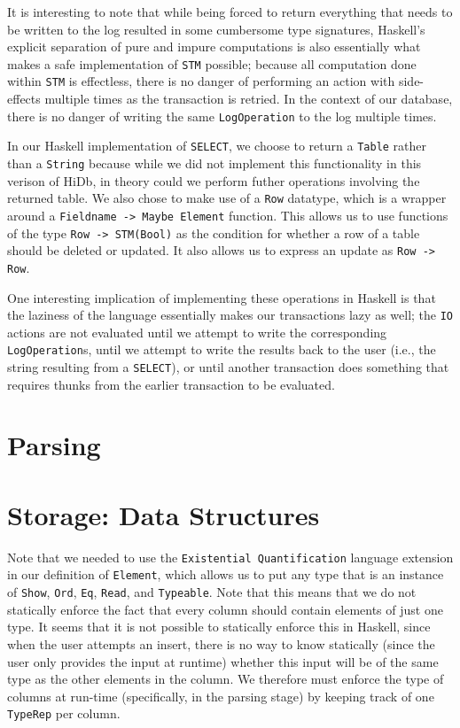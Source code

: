 \documentclass[10pt]{article}
\begin{document}
\begin{multicols}{2}
It is interesting to note that while being forced to return everything that needs to be written to the log resulted in some cumbersome type signatures, 
Haskell's explicit separation of pure and impure computations is also essentially what makes a safe implementation of \texttt{STM} possible; because all computation done within \texttt{STM} is effectless, there is no danger of performing an action with side-effects multiple times as the transaction is retried. In the context of our database, there is no danger of writing the same \texttt{LogOperation} to the log multiple times.

In our Haskell implementation of \texttt{SELECT}, we choose to return a \texttt{Table} rather than a \texttt{String} because while we did not implement this functionality in this verison of HiDb, in theory could we perform futher operations involving the returned table. We also chose to make use of a \texttt{Row} datatype, which is a wrapper around a \texttt{Fieldname -> Maybe Element} function. This allows us to use functions of the type \texttt{Row -> STM(Bool)} as the condition for whether a row of a table should be deleted or updated. It also allows us to express an update as \texttt{Row -> Row}. 

One interesting implication of implementing these operations in Haskell is that the laziness of the language essentially makes our transactions lazy as well; the \texttt{IO} actions are not evaluated until we attempt to write the corresponding \texttt{LogOperation}s, until we attempt to write the results back to the user (i.e., the string resulting from a \texttt{SELECT}), or until another transaction does something that requires thunks from the earlier transaction to be evaluated.
\section{Parsing}

\section{Storage: Data Structures}

Note that we needed to use the \texttt{Existential Quantification} language extension in our definition of \texttt{Element}, which allows us to put any type that is an instance of \texttt{Show}, \texttt{Ord}, \texttt{Eq}, \texttt{Read}, and \texttt{Typeable}.  Note that this means that we do not statically enforce the fact that every column should contain elements of just one type. It seems that it is not possible to statically enforce this in Haskell, since when the user attempts an insert, there is no way to know statically (since the user only provides the input at runtime) whether this input will be of the same type as the other elements in the column. We therefore must enforce the type of columns at run-time (specifically, in the parsing stage) by keeping track of one \texttt{TypeRep} per column. 


\end{multicols}
\end{document}
